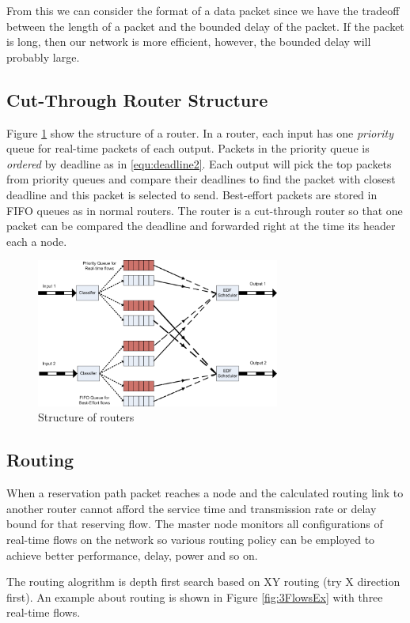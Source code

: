 \documentclass[conference, twocolumn]{IEEEtran}
\theoremstyle{definition}
\begin{document}
From this we can consider the format of a data packet since we have the 
tradeoff between the length of a packet and the bounded delay of the packet. 
If the packet is long, then our network is more efficient, however, the bounded 
delay will probably large.

\subsection{Cut-Through Router Structure}

Figure \ref{fig:RouterStructure} show the structure of a router. In a router,
each input has one {\em priority} queue for real-time packets of each output.
Packets in the priority queue is {\em ordered} by deadline as in
\ref{equ:deadline2}. Each output will pick the top packets from priority queues
and compare their deadlines to find the packet with closest deadline and this
packet is selected to send. Best-effort packets are stored in FIFO queues as in
normal routers. The router is a cut-through router so that one packet can be
compared the deadline and forwarded right at the time its header each a node.

\begin{figure}[htp]
\centering
\includegraphics[width=8cm]{pics/Router.png}
\caption[Other Spec.]
{Structure of routers}\label{fig:RouterStructure}
\end{figure}

\subsection{Routing}
When a reservation path packet reaches a node and the calculated routing link 
to another router cannot afford the service time and transmission rate or delay 
bound for that reserving flow. The master node monitors all configurations of
real-time flows on the network so various routing policy can be employed to
achieve better performance, delay, power and so on.

The routing alogrithm is depth first search based on XY routing (try X
direction first). An example about routing is shown in Figure
\ref{fig:3FlowsEx} with three real-time flows.
\end{document}
